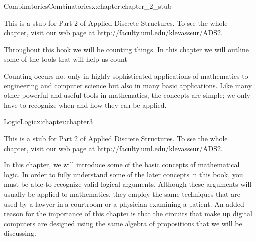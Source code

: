 \documentclass[twoside,10pt,]{book}
\numberwithin{equation}{section}
\begin{document}
%
%
\typeout{************************************************}
\typeout{************************************************}
%
\begin{chapterptx}{Combinatorics}{}{Combinatorics}{}{}{x:chapter:chapter_2_stub}
\begin{introduction}{}%
This is a stub for Part 2 of Applied Discrete Structures. To see the whole chapter, visit our web page at http:\slash{}\slash{}faculty.uml.edu\slash{}klevasseur\slash{}ADS2.%
\par
Throughout this book we will be counting things. In this chapter we will outline some of the tools that will help us count.%
\par
Counting occurs not only in highly sophisticated applications of mathematics to engineering and computer science but also in many basic applications. Like many other powerful and useful tools in mathematics, the concepts are simple; we only have to recognize when and how they can be applied.%
\end{introduction}%
\end{chapterptx}
%
%
\typeout{************************************************}
\typeout{************************************************}
%
\begin{chapterptx}{Logic}{}{Logic}{}{}{x:chapter:chapter3}
\begin{introduction}{}%
This is a stub for Part 2 of Applied Discrete Structures. To see the whole chapter, visit our web page at http:\slash{}\slash{}faculty.uml.edu\slash{}klevasseur\slash{}ADS2.%
\par
In this chapter, we will introduce some of the basic concepts of mathematical logic. In order to fully understand some of the later concepts in this 	book, you must be able to recognize valid logical arguments. Although these arguments will usually be applied to mathematics, they employ the same techniques that are used by a lawyer in a courtroom or a physician examining a patient. An added reason for the importance of this chapter is that the circuits that make up digital computers are designed using the same algebra of propositions that we will be discussing.%
\end{introduction}%
\end{chapterptx}
%
%
\typeout{************************************************}
\typeout{************************************************}
%
\end{document}
